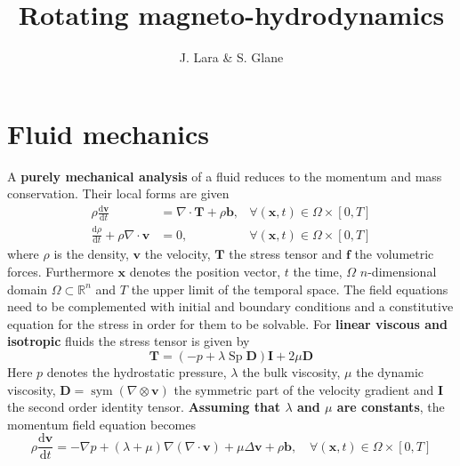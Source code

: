\documentclass[]{scrartcl}
\title{Rotating magneto-hydrodynamics}
\author{J. Lara \& S. Glane}
\newcommand{\tdfrac}[2]{\frac{\mathrm{d} #1}{\mathrm{d} #2}}
\DeclareMathOperator{\Spur}{Sp}
\DeclareMathOperator{\Sym}{sym}
\begin{document}
\maketitle

\begin{abstract}

\end{abstract}

\section{Fluid mechanics}\label{Sec:FluidMechanics}
A \textbf{purely mechanical analysis} of a fluid reduces to the momentum and mass conservation. Their local forms are given
\begin{equation*}
	\begin{aligned}
		\rho \tdfrac{\mathbf{v}}{t} &= \nabla \cdot \mathbf{T} + \rho \mathbf{b}, &\forall (\mathbf{x}, t) \in \Omega \times \left[0, T \right] \\
		\tdfrac{\rho}{t} + \rho \nabla \cdot \mathbf{v}&= 0, &\forall (\mathbf{x}, t) \in \Omega \times  \left[0, T \right]
	\end{aligned}
\end{equation*} 
where $\rho$ is the density, $\mathbf{v}$ the velocity, $\mathbf{T}$ the stress tensor and $\mathbf{f}$ the volumetric forces. Furthermore $\mathbf{x}$ denotes the position vector, $t$ the time, $\Omega$  $n$-dimensional domain $\Omega \subset \mathbb{R}^n$ and $T$ the upper limit of the temporal space. The field equations need to be complemented with initial and boundary conditions and a constitutive equation for the stress in order for them to be solvable. For \textbf{linear viscous and isotropic} fluids the stress tensor is given by
\begin{equation*}
	\mathbf{T} = (-p + \lambda \Spur \mathbf{D}) \mathbf{I} + 2 \mu \mathbf{D}
\end{equation*}
Here $p$ denotes the hydrostatic pressure, $\lambda$ the bulk viscosity, $\mu$ the dynamic viscosity, $\mathbf{D} = \Sym (\nabla \otimes \mathbf{v})$ the symmetric part of the velocity gradient and $\mathbf{I}$ the second order identity tensor. \textbf{Assuming that $\lambda$ and $\mu$ are constants}, the momentum field equation becomes
\begin{equation*}
\rho \tdfrac{\mathbf{v}}{t} = -\nabla p + (\lambda + \mu) \nabla (\nabla \cdot \mathbf{v}) + \mu \Delta \mathbf{v} + \rho\mathbf{b}, \quad \forall (\mathbf{x}, t) \in \Omega \times \left[0, T \right]
\end{equation*}
\end{document}
